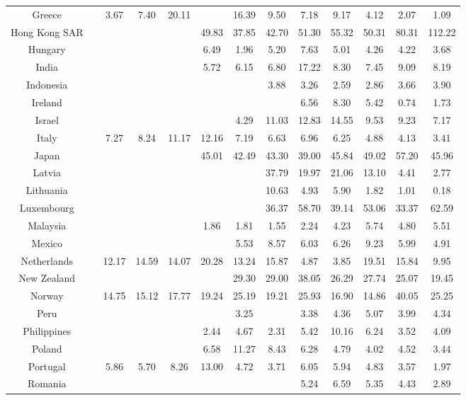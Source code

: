 \documentclass[a4paper, twoside]{templates/ociamthesis}
\begin{document}
\begin{table}
{\begin{tabular}[t]{ccccccccccccc}
Greece &  & 3.67 & 7.40 & 20.11 &  & 16.39 & 9.50 & 7.18 & 9.17 & 4.12 & 2.07 & 1.09\\
Hong Kong SAR &  &  &  &  & 49.83 & 37.85 & 42.70 & 51.30 & 55.32 & 50.31 & 80.31 & 112.22\\
Hungary &  &  &  &  & 6.49 & 1.96 & 5.20 & 7.63 & 5.01 & 4.26 & 4.22 & 3.68\\
India &  &  &  &  & 5.72 & 6.15 & 6.80 & 17.22 & 8.30 & 7.45 & 9.09 & 8.19\\
Indonesia &  &  &  &  &  &  & 3.88 & 3.26 & 2.59 & 2.86 & 3.66 & 3.90\\
Ireland &  &  &  &  &  &  &  & 6.56 & 8.30 & 5.42 & 0.74 & 1.73\\
Israel &  &  &  &  &  & 4.29 & 11.03 & 12.83 & 14.55 & 9.53 & 9.23 & 7.17\\
Italy &  & 7.27 & 8.24 & 11.17 & 12.16 & 7.19 & 6.63 & 6.96 & 6.25 & 4.88 & 4.13 & 3.41\\
Japan &  &  &  &  & 45.01 & 42.49 & 43.30 & 39.00 & 45.84 & 49.02 & 57.20 & 45.96\\
Latvia &  &  &  &  &  &  & 37.79 & 19.97 & 21.06 & 13.10 & 4.41 & 2.77\\
Lithuania &  &  &  &  &  &  & 10.63 & 4.93 & 5.90 & 1.82 & 1.01 & 0.18\\
Luxembourg &  &  &  &  &  &  & 36.37 & 58.70 & 39.14 & 53.06 & 33.37 & 62.59\\
Malaysia &  &  &  &  & 1.86 & 1.81 & 1.55 & 2.24 & 4.23 & 5.74 & 4.80 & 5.51\\
Mexico &  &  &  &  &  & 5.53 & 8.57 & 6.03 & 6.26 & 9.23 & 5.99 & 4.91\\
Netherlands &  & 12.17 & 14.59 & 14.07 & 20.28 & 13.24 & 15.87 & 4.87 & 3.85 & 19.51 & 15.84 & 9.95\\
New Zealand &  &  &  &  &  & 29.30 & 29.00 & 38.05 & 26.29 & 27.74 & 25.07 & 19.45\\
Norway &  & 14.75 & 15.12 & 17.77 & 19.24 & 25.19 & 19.21 & 25.93 & 16.90 & 14.86 & 40.05 & 25.25\\
Peru &  &  &  &  &  & 3.25 &  & 3.38 & 4.36 & 5.07 & 3.99 & 4.34\\
Philippines &  &  &  &  & 2.44 & 4.67 & 2.31 & 5.42 & 10.16 & 6.24 & 3.52 & 4.09\\
Poland &  &  &  &  & 6.58 & 11.27 & 8.43 & 6.28 & 4.79 & 4.02 & 4.52 & 3.44\\
Portugal &  & 5.86 & 5.70 & 8.26 & 13.00 & 4.72 & 3.71 & 6.05 & 5.94 & 4.83 & 3.57 & 1.97\\
Romania &  &  &  &  &  &  &  & 5.24 & 6.59 & 5.35 & 4.43 & 2.89\\

\end{tabular}}
\end{table}
\end{document}
